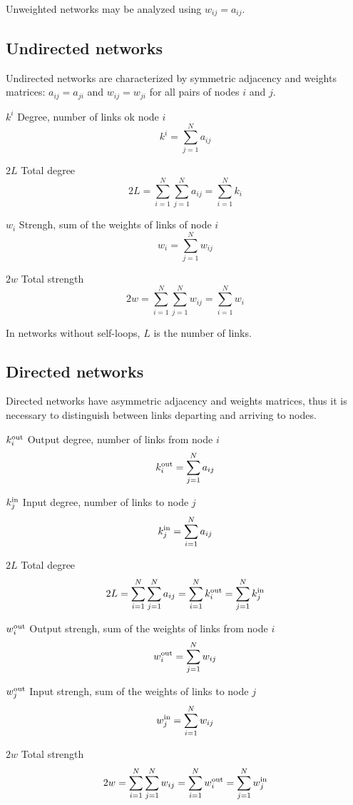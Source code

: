 \documentclass[11pt]{article}
\newcommand{\beq}{\begin{equation}}
\newcommand{\eeq}{\end{equation}}
\newcommand{\sz}{\scriptsize}
\newcommand{\wout}[2]{{#1}_{#2}^{\mbox{\sz out}}}
\newcommand{\win}[2]{{#1}_{#2}^{\mbox{\sz in}}}
\newcommand{\bdesc}[2]{\begin{basedescript}{\desclabelstyle{\pushlabel}\desclabelwidth{#1}\setlength{\labelsep}{0mm}\setlength{\leftmargin}{#2}}}
\newcommand{\edesc}{\end{basedescript}}
\begin{document}
\noindent
Unweighted networks may be analyzed using $w_{ij}=a_{ij}$.


\subsection{Undirected networks}

Undirected networks are characterized by symmetric adjacency and weights matrices:
$a_{ij}=a_{ji}$ and $w_{ij}=w_{ji}$ for all pairs of nodes $i$ and $j$.

\bdesc{12mm}{12mm}
\item[$k^i$] Degree, number of links ok node $i$
  \beq
    k^i = \sum_{j=1}^N a_{ij}
  \eeq
\item[$2 L$] Total degree
  \beq
    2 L = \sum_{i=1}^N \sum_{j=1}^N a_{ij} = \sum_{i=1}^N k_i
  \eeq
\item[$w_i$] Strengh, sum of the weights of links of node $i$
  \beq
    w_i = \sum_{j=1}^N w_{ij}
  \eeq
\item[$2 w$] Total strength
  \beq
    2 w = \sum_{i=1}^N \sum_{j=1}^N w_{ij} = \sum_{i=1}^N w_i
  \eeq
\edesc

\noindent
In networks without self-loops, $L$ is the number of links.


\subsection{Directed networks}

Directed networks have asymmetric adjacency and weights matrices, thus it is necessary
to distinguish between links departing and arriving to nodes.

\bdesc{12mm}{12mm}
\item[$\wout{k}{i}$] Output degree, number of links from node $i$
  \beq
    \wout{k}{i} = \sum_{j=1}^N a_{ij}
  \eeq
\item[$\win{k}{j}$] Input degree, number of links to node $j$
  \beq
    \win{k}{j} = \sum_{i=1}^N a_{ij}
  \eeq
\item[$2 L$] Total degree
  \beq
    2 L = \sum_{i=1}^N \sum_{j=1}^N a_{ij} = \sum_{i=1}^N \wout{k}{i} = \sum_{j=1}^N \win{k}{j}
  \eeq
\item[$\wout{w}{i}$] Output strengh, sum of the weights of links from node $i$
  \beq
    \wout{w}{i} = \sum_{j=1}^N w_{ij}
  \eeq
\item[$\wout{w}{j}$] Input strengh, sum of the weights of links to node $j$
  \beq
    \win{w}{j} = \sum_{i=1}^N w_{ij}
  \eeq
\item[$2 w$] Total strength
  \beq
    2 w = \sum_{i=1}^N \sum_{j=1}^N w_{ij} = \sum_{i=1}^N \wout{w}{i} = \sum_{j=1}^N \win{w}{j}
  \eeq
\edesc
\end{document}

